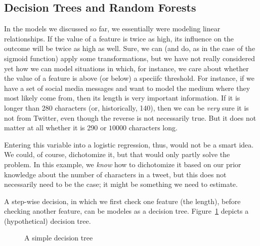 \subsection{Decision Trees and Random Forests}
In the models we discussed so far, we essentially were modeling linear relationships. If the value of a feature is twice as high, its influence on the outcome will be twice as high as well.
Sure, we can (and do, as in the case of the sigmoid function) apply some transformations, but we have not really considered yet how we can model situations in which, for instance, we care about whether the value of a feature is above (or below) a speciifc threshold.
For instance, if we have a set of social media messages and want to model the medium where they most likely come from, then its length is  very important information. If it is longer than 280 characters (or, historically, 140), then we can be \emph{very} sure it is not from Twitter, even though the reverse is not necessarily true. But it does not matter at all whether it is 290 or $10000$ characters long.

Entering this variable into a logistic regression, thus, would not be a smart idea.
We could, of course, dichotomize it, but that would only partly solve the problem.
In this example, we \emph{know} how to dichotomize it based on our prior knowledge about the number of characters in a tweet, but this does not necessarily need to be the case; it might be something we need to estimate.

A step-wise decision, in which we first check one feature (the length), before checking another feature, can be modeles as a decision tree.
Figure~\ref{fig:decisiontree} depicts a (hypothetical) decision tree.

\begin{figure}
  \centering
{}
  \caption{\label{fig:decisiontree}A simple decision tree}
\end{figure}

